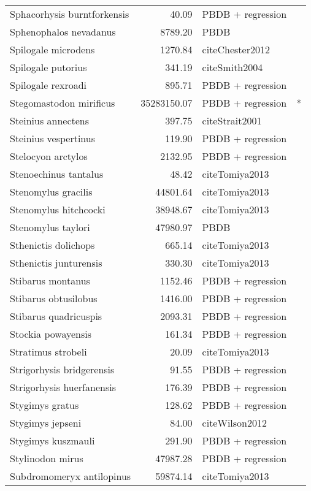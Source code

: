 \begin{table}[ht]
\begin{tabular}{lrll}
  Sphacorhysis burntforkensis & 40.09 & PBDB + regression &  \\ 
  Sphenophalos nevadanus & 8789.20 & PBDB &  \\ 
  Spilogale microdens & 1270.84 & cite{Chester2012} &  \\ 
  Spilogale putorius & 341.19 & cite{Smith2004} &  \\ 
  Spilogale rexroadi & 895.71 & PBDB + regression &  \\ 
  Stegomastodon mirificus & 35283150.07 & PBDB + regression & * \\ 
  Steinius annectens & 397.75 & cite{Strait2001} &  \\ 
  Steinius vespertinus & 119.90 & PBDB + regression &  \\ 
  Stelocyon arctylos & 2132.95 & PBDB + regression &  \\ 
  Stenoechinus tantalus & 48.42 & cite{Tomiya2013} &  \\ 
  Stenomylus gracilis & 44801.64 & cite{Tomiya2013} &  \\ 
  Stenomylus hitchcocki & 38948.67 & cite{Tomiya2013} &  \\ 
  Stenomylus taylori & 47980.97 & PBDB &  \\ 
  Sthenictis dolichops & 665.14 & cite{Tomiya2013} &  \\ 
  Sthenictis junturensis & 330.30 & cite{Tomiya2013} &  \\ 
  Stibarus montanus & 1152.46 & PBDB + regression &  \\ 
  Stibarus obtusilobus & 1416.00 & PBDB + regression &  \\ 
  Stibarus quadricuspis & 2093.31 & PBDB + regression &  \\ 
  Stockia powayensis & 161.34 & PBDB + regression &  \\ 
  Stratimus strobeli & 20.09 & cite{Tomiya2013} &  \\ 
  Strigorhysis bridgerensis & 91.55 & PBDB + regression &  \\ 
  Strigorhysis huerfanensis & 176.39 & PBDB + regression &  \\ 
  Stygimys gratus & 128.62 & PBDB + regression &  \\ 
  Stygimys jepseni & 84.00 & cite{Wilson2012} &  \\ 
  Stygimys kuszmauli & 291.90 & PBDB + regression &  \\ 
  Stylinodon mirus & 47987.28 & PBDB + regression &  \\ 
  Subdromomeryx antilopinus & 59874.14 & cite{Tomiya2013} &  \\ 

\end{tabular}
\end{table}
